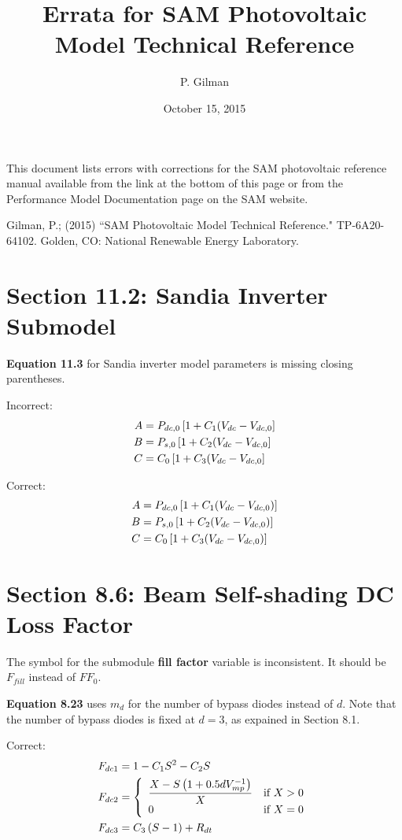 \documentclass[report]{nrel}
\title{Errata for SAM Photovoltaic Model Technical Reference}
\author{P. Gilman}
\date{October 15, 2015}
\begin{document}
This document lists errors with corrections for the SAM photovoltaic reference manual available from the link at the bottom of this page or from the Performance Model Documentation page on the SAM website.

Gilman, P.; (2015) ``SAM Photovoltaic Model Technical Reference." TP-6A20-64102. Golden, CO: National Renewable Energy Laboratory.

\section*{Section 11.2: Sandia Inverter Submodel}

\textbf{Equation 11.3} for Sandia inverter model parameters is missing closing parentheses.

Incorrect:
\begin{align*}
A &=P_{dc,0} \left[ 1+ C_1 ( V_{dc} - V_{dc,0}\right] \notag\\
B &= P_{s,0}  \left[ 1+ C_2 ( V_{dc} - V_{dc,0}\right] \notag\\
C &= C_0  \left[ 1+ C_3 ( V_{dc} - V_{dc,0}\right]
\end{align*}

Correct:
\begin{align*}
A &=P_{dc,0} \left[ 1+ C_1 ( V_{dc} - V_{dc,0} )\right] \notag\\
B &= P_{s,0}  \left[ 1+ C_2 ( V_{dc} - V_{dc,0} )\right] \notag\\
C &= C_0  \left[ 1+ C_3 ( V_{dc} - V_{dc,0} )\right]
\end{align*}

\section*{Section 8.6: Beam Self-shading DC Loss Factor}

The symbol for the submodule \textbf{fill factor} variable is inconsistent. It should be $F_{fill}$ instead of $\mathit{FF}_0$.

\textbf{Equation 8.23} uses $m_d$ for the number of bypass diodes instead of $d$. Note that the number of bypass diodes is fixed at $d=3$, as expained in Section 8.1.

Correct:
\begin{align*}
F_{dc1} &= 1-C_1S^2-C_2S \notag\\ %
F_{dc2} &= 
\left\{
   \begin{array}{ll}
      \dfrac{X-S\left(1+0.5 d V^{-1}_{mp}\right)}{X} & \text{if $X>0$}\\
      0 & \text{if $X=0$}\\
   \end{array}
\right. \notag\\ %
F_{dc3} &= C_3\left(S-1\right)+R_{dt} %
\end{align*}
\end{document}
